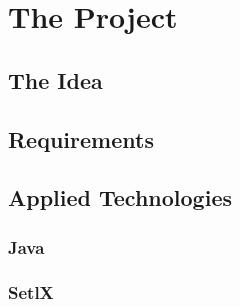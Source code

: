 
\chapter{The Project}

\section{The Idea}

\section{Requirements}

\section{Applied Technologies}

	\subsection{Java}

	\subsection{SetlX}